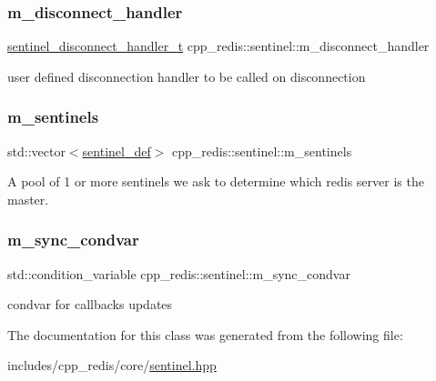 \subsubsection{\texorpdfstring{m\+\_\+disconnect\+\_\+handler}{m\_disconnect\_handler}}
{\footnotesize\ttfamily \hyperlink{classcpp__redis_1_1sentinel_a923e06b5b700c16dffec8a01d2fa9aa4}{sentinel\+\_\+disconnect\+\_\+handler\+\_\+t} cpp\+\_\+redis\+::sentinel\+::m\+\_\+disconnect\+\_\+handler\hspace{0.3cm}{\ttfamily [private]}}

user defined disconnection handler to be called on disconnection \mbox{\label{classcpp__redis_1_1sentinel_a3eea36960df4e9f8f7ef54c42a91e349}} 
\subsubsection{\texorpdfstring{m\+\_\+sentinels}{m\_sentinels}}
{\footnotesize\ttfamily std\+::vector$<$\hyperlink{classcpp__redis_1_1sentinel_1_1sentinel__def}{sentinel\+\_\+def}$>$ cpp\+\_\+redis\+::sentinel\+::m\+\_\+sentinels\hspace{0.3cm}{\ttfamily [private]}}

A pool of 1 or more sentinels we ask to determine which redis server is the master. \mbox{\label{classcpp__redis_1_1sentinel_a069c52d386173818d4c0656b242107dd}} 
\subsubsection{\texorpdfstring{m\+\_\+sync\+\_\+condvar}{m\_sync\_condvar}}
{\footnotesize\ttfamily std\+::condition\+\_\+variable cpp\+\_\+redis\+::sentinel\+::m\+\_\+sync\+\_\+condvar\hspace{0.3cm}{\ttfamily [private]}}

condvar for callbacks updates 

The documentation for this class was generated from the following file\+:\begin{DoxyCompactItemize}
\item 
includes/cpp\+\_\+redis/core/\hyperlink{sentinel_8hpp}{sentinel.\+hpp}\end{DoxyCompactItemize}

